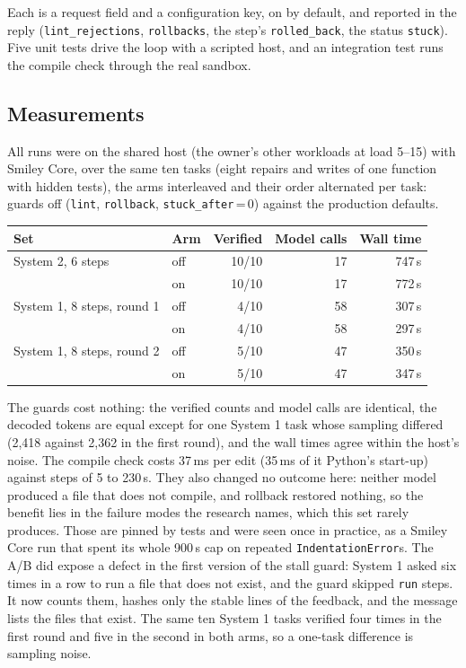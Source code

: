 Each is a request field and a configuration key, on by default, and reported in the reply (\texttt{lint\_rejections}, \texttt{rollbacks},
the step's \texttt{rolled\_back}, the status \texttt{stuck}). Five unit tests drive the loop with a scripted host, and an integration test
runs the compile check through the real sandbox.

\subsection{Measurements}

All runs were on the shared host (the owner's other workloads at load 5--15) with Smiley Core, over the same ten tasks (eight repairs and writes of one
function with hidden tests), the arms interleaved and their order alternated per task: guards off (\texttt{lint}, \texttt{rollback},
\texttt{stuck\_after}\,=\,0) against the production defaults.

\begin{center}
\begin{tabular}{llrrr}
\hline
Set & Arm & Verified & Model calls & Wall time \\
\hline
System 2, 6 steps & off & 10/10 & 17 & 747\,s \\
 & on & 10/10 & 17 & 772\,s \\
System 1, 8 steps, round 1 & off & 4/10 & 58 & 307\,s \\
 & on & 4/10 & 58 & 297\,s \\
System 1, 8 steps, round 2 & off & 5/10 & 47 & 350\,s \\
 & on & 5/10 & 47 & 347\,s \\
\hline
\end{tabular}
\end{center}

The guards cost nothing: the verified counts and model calls are identical, the decoded tokens are equal except for one System 1 task whose
sampling differed (2,418 against 2,362 in the first round), and the wall times agree within the host's noise. The compile check costs 37\,ms per edit (35\,ms of it Python's start-up) against steps of 5 to 230\,s. They also changed no
outcome here: neither model produced a file that does not compile, and rollback restored nothing, so the benefit lies in the failure modes
the research names, which this set rarely produces. Those are pinned by tests and were seen once in practice, as a Smiley Core run that
spent its whole 900\,s cap on repeated \texttt{IndentationError}s. The A/B did expose a defect in the first version of the stall guard:
System 1 asked six times in a row to run a file that does not exist, and the guard skipped \texttt{run} steps. It now counts them, hashes
only the stable lines of the feedback, and the message lists the files that exist. The same ten System 1 tasks verified four times in the
first round and five in the second in both arms, so a one-task difference is sampling noise.

